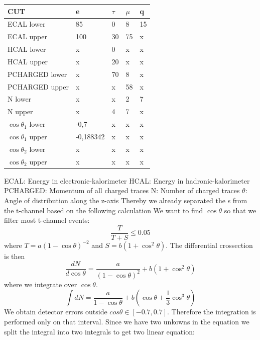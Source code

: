 \documentclass[]{article}
\begin{document}
\begin{tabular}{ |p{4cm}||p{2cm}|p{2cm}|p{2cm}|p{2cm}|  }
 \hline
 CUT & e & $\tau$ & $\mu$ & q \\
 \hline
 ECAL lower & 85 & 0 & 8 & 15 \\
 ECAL upper & 100 & 30 & 75 & x \\
 HCAL lower & x & 0 & x & x \\
 HCAL upper & x & 20 & x & x \\
 PCHARGED lower & x & 70 & 8 & x \\
 PCHARGED upper & x & x & 58 & x \\
 N lower & x & x & 2 & 7 \\
 N upper & x & 4 & 7 &x \\
 $\cos\theta_1$ lower & -0,7 & x & x & x \\
 $\cos\theta_1$ upper & -0,188342 & x & x & x \\
 $\cos\theta_2$ lower & x & x & x & x \\
 $\cos\theta_2$ upper & x & x & x & x \\
 \hline
\end{tabular}
\newline
ECAL: Energy in electronic-kalorimeter
\newline
HCAL: Energy in hadronic-kalorimeter
\newline
PCHARGED: Momentum of all charged traces
\newline
N: Number of charged traces
\newline
$\theta$: Angle of distribution along the z-axis
\newline
\newline
Thereby we already separated the s from the t-channel based on the following calculation
\newline
We want to find $\cos\theta$ so that we filter most t-channel events:
\begin{equation}
\frac{T}{T+S} \leq 0.05
\label{eq:cond}
\end{equation}
where  $T=a(1-\cos{\theta})^{-2}$  and $S=b(1+\cos^2{\theta})$. 
The differential crossection is then
\begin{equation}
\frac{dN}{d\cos\theta} = \frac{a}{(1-\cos\theta)^2}+b(1+\cos^2\theta)
\end{equation}
where we integrate over $\cos\theta$.
\begin{equation}
\int dN = \frac{a}{1-\cos\theta} + b\left(\cos\theta+\frac{1}{3}\cos^3\theta\right)
\end{equation}
We obtain detector errors outside $cos\theta \in [-0.7,0.7]$. Therefore the integration is performed only on that interval. Since we have two unkowns in the equation we split the integral into two integrals to get two linear equation:
\end{document}
